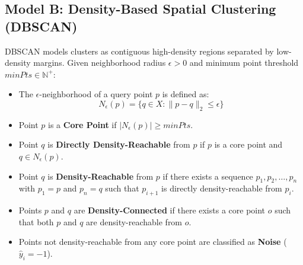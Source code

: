 \documentclass[12pt,a4paper]{article}
\begin{document}
\subsection{Model B: Density-Based Spatial Clustering (DBSCAN)}
DBSCAN models clusters as contiguous high-density regions separated by low-density margins. Given neighborhood radius $\epsilon > 0$ and minimum point threshold $minPts \in \mathbb{N}^+$:
\begin{itemize}
\item The $\epsilon$-neighborhood of a query point $p$ is defined as:
\begin{equation}
N_\epsilon(p) = \{ q \in X : \| p - q \|_2 \le \epsilon \}
\end{equation}
\item Point $p$ is a \textbf{Core Point} if $|N_\epsilon(p)| \ge minPts$.
\item Point $q$ is \textbf{Directly Density-Reachable} from $p$ if $p$ is a core point and $q \in N_\epsilon(p)$.
\item Point $q$ is \textbf{Density-Reachable} from $p$ if there exists a sequence $p_1, p_2, \dots, p_n$ with $p_1 = p$ and $p_n = q$ such that $p_{i+1}$ is directly density-reachable from $p_i$.
\item Points $p$ and $q$ are \textbf{Density-Connected} if there exists a core point $o$ such that both $p$ and $q$ are density-reachable from $o$.
\item Points not density-reachable from any core point are classified as \textbf{Noise} ($\hat{y}_i = -1$).
\end{itemize}
\end{document}
